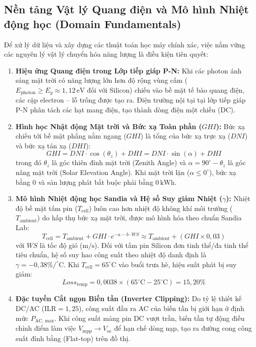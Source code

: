 \documentclass[12pt, a4paper]{report}
\begin{document}
\subsection{Nền tảng Vật lý Quang điện và Mô hình Nhiệt động học (Domain Fundamentals)}
Để xử lý dữ liệu và xây dựng các thuật toán học máy chính xác, việc nắm vững các nguyên lý vật lý chuyển hóa năng lượng là điều kiện tiên quyết:
\begin{enumerate}[label=\arabic*., leftmargin=*]
    \item \textbf{Hiệu ứng Quang điện trong Lớp tiếp giáp P-N:} Khi các photon ánh sáng mặt trời có năng lượng lớn hơn độ rộng vùng cấm ($E_{\text{photon}} \ge E_g \approx 1{,}12\,\text{eV}$ đối với Silicon) chiếu vào bề mặt tế bào quang điện, các cặp electron -- lỗ trống được tạo ra. Điện trường nội tại tại lớp tiếp giáp P-N phân tách các hạt mang điện, tạo thành dòng điện một chiều (DC).
    
    \item \textbf{Hình học Nhật động Mặt trời và Bức xạ Toàn phần ($GHI$):} Bức xạ chiếu tới bề mặt phẳng nằm ngang ($GHI$) là tổng của bức xạ trực xạ ($DNI$) và bức xạ tán xạ ($DHI$):
    \begin{equation}
        GHI = DNI \cdot \cos(\theta_z) + DHI = DNI \cdot \sin(\alpha) + DHI
    \end{equation}
    trong đó $\theta_z$ là góc thiên đỉnh mặt trời (Zenith Angle) và $\alpha = 90^\circ - \theta_z$ là góc nâng mặt trời (Solar Elevation Angle). Khi mặt trời lặn ($\alpha \le 0^\circ$), bức xạ bằng $0$ và sản lượng phát bắt buộc phải bằng $0\,\text{kWh}$.

    \item \textbf{Mô hình Nhiệt động học Sandia và Hệ số Suy giảm Nhiệt ($\gamma$):} Nhiệt độ bề mặt tấm pin ($T_{\text{cell}}$) luôn cao hơn nhiệt độ không khí môi trường ($T_{\text{ambient}}$) do hấp thụ bức xạ mặt trời, được mô hình hóa theo chuẩn Sandia Lab:
    \begin{equation}
        T_{\text{cell}} = T_{\text{ambient}} + GHI \cdot e^{-a - b \cdot WS} \approx T_{\text{ambient}} + (GHI \times 0{,}03)
    \end{equation}
    với $WS$ là tốc độ gió ($\text{m/s}$). Đối với tấm pin Silicon đơn tinh thể/đa tinh thể tiêu chuẩn, hệ số suy hao công suất theo nhiệt độ danh định là $\gamma = -0{,}38\%/^\circ\text{C}$. Khi $T_{\text{cell}} = 65^\circ\text{C}$ vào buổi trưa hè, hiệu suất phát bị suy giảm:
    \begin{equation}
        Loss_{\text{temp}} = 0{,}0038 \times (65^\circ\text{C} - 25^\circ\text{C}) = 15{,}20\%
    \end{equation}

    \item \textbf{Đặc tuyến Cắt ngọn Biến tần (Inverter Clipping):} Do tỷ lệ thiết kế DC/AC ($\text{ILR} = 1{,}25$), công suất đầu ra AC của biến tần bị giới hạn ở định mức $P_{\text{AC, max}}$. Khi công suất mảng pin DC vượt trần, biến tần tự động điều chỉnh điểm làm việc $V_{\text{mpp}} \to V_{\text{oc}}$ để hạn chế dòng nạp, tạo ra đường cong công suất đỉnh bằng (Flat-top) trên đồ thị.
\end{enumerate}
\end{document}
